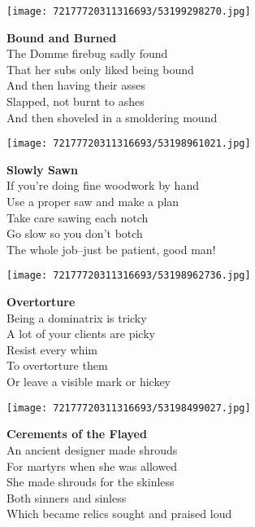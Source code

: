 \documentclass[10pt,letterpaper]{article}
\begin{document}
\begin{center}\texttt{[image: 72177720311316693/53199298270.jpg]}
\end{center}
\begin{center}
\textbf{Bound and Burned}\\
\vskip 0.2in
The Domme firebug sadly found\\
That her subs only liked being bound\\
And then having their asses\\
Slapped, not burnt to ashes\\
And then shoveled in a smoldering mound\\
\end{center}
\pagebreak

\begin{center}\texttt{[image: 72177720311316693/53198961021.jpg]}
\end{center}
\begin{center}
\textbf{Slowly Sawn}\\
\vskip 0.2in
If you're doing fine woodwork by hand\\
Use a proper saw and make a plan\\
Take care sawing each notch\\
Go slow so you don't botch\\
The whole job--just be patient, good man!\\
\end{center}
\pagebreak

\begin{center}
\texttt{[image: 72177720311316693/53198962736.jpg]}
\end{center}

\begin{center}
\textbf{Overtorture}\\
\vskip 0.2in
Being a dominatrix is tricky\\
A lot of your clients are picky\\
Resist every whim\\
To overtorture them\\
Or leave a visible mark or hickey\\
\end{center}
\pagebreak

\begin{center}\texttt{[image: 72177720311316693/53198499027.jpg]}
\end{center}
\begin{center}
\textbf{Cerements of the Flayed}\\
\vskip 0.2in
An ancient designer made shrouds\\
For martyrs when she was allowed\\
She made shrouds for the skinless\\
Both sinners and sinless\\
Which became relics sought and praised loud\\
\end{center}
\pagebreak
\end{document}
